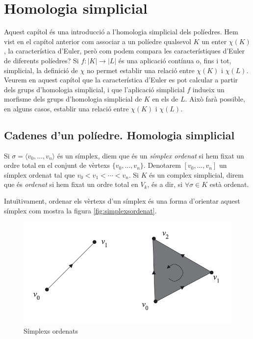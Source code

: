 \documentclass[../main.tex]{subfiles}
\begin{document}
\chapter{Homologia simplicial}


Aquest capítol és una introducció a l'homologia simplicial dels políedres. Hem vist en el capítol anterior com associar a un políedre qualsevol $K$ un enter $\chi(K)$, la característica d'Euler, però com podem compara les característiques d'Euler de diferents políedres? Si $f:|K|\rightarrow|L|$ és una aplicació contínua o, fins i tot, simplicial, la definició de $\chi$ no permet establir una relació entre $\chi(K)$ i $\chi(L)$. Veurem en aquest capítol que la característica d'Euler es pot calcular a partir dels grups d'homologia simplicial, i que l'aplicació simplicial $f$ indueix un morfisme dels grups d'homologia simplicial de $K$ en els de $L$. Això farà possible, en alguns casos, establir una relació entre $\chi(K)$ i $\chi(L)$.




\section{Cadenes d'un políedre. Homologia simplicial}


\begin{defi}
Si $\sigma = \langle v_0,\ldots,v_n\rangle$ és un símplex, diem que és un \textit{símplex ordenat} si hem fixat un ordre total en el conjunt de vèrtexs $\{v_0,\ldots,v_n\}$. Denotarem $[v_0,\ldots,v_n]$ un símplex ordenat tal que $v_0<v_1<\cdots<v_n$. Si $K$ és un complex simplicial, direm que és \textit{ordenat} si hem fixat un ordre total en $V_k$, és a dir, si $\forall \sigma\in K$ està ordenat.
\end{defi}

Intuïtivament, ordenar els vèrtexs d'un símplex és una forma d'orientar aquest símplex com mostra la figura \ref{fig:simplexsordenat}.
\begin{figure}
    \centering
    \includegraphics[scale = 0.25]{pictures/simplexsordenats.png}
    \caption{Símplexs ordenats}
    \label{fig:simplexsordenats}
\end{figure}
\end{document}
